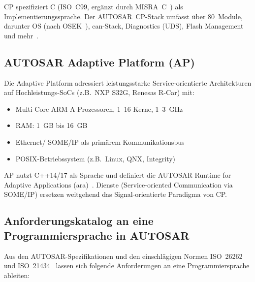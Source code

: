 ﻿\documentclass[12pt,a4paper,twoside]{article}
\begin{document}
CP spezifiziert C (ISO~C99, ergänzt durch MISRA~C~\cite{misra_c2012})
als Implementierungssprache. Der AUTOSAR~CP-Stack umfasst über 80~Module,
darunter OS (nach OSEK~\cite{osek_spec}), \gls{can}-Stack, Diagnostics (UDS),
Flash Management und mehr~\cite{autosar_cp_r23}.

\subsection{AUTOSAR Adaptive Platform (AP)}
\label{subsec:ap}

Die Adaptive Platform adressiert leistungsstarke Service-orientierte Architekturen
auf Hochleistungs-SoCs (z.B.\ NXP S32G, Renesas R-Car) mit:
\begin{itemize}
  \item Multi-Core ARM-A-Prozessoren, 1--16 Kerne, 1--3~GHz
  \item RAM: 1~GB bis 16~GB
  \item Ethernet/ SOME/IP als primärem Kommunikationsbus
  \item POSIX-Betriebssystem (z.B.\ Linux, QNX, Integrity)
\end{itemize}

AP nutzt C++14/17 als Sprache und definiert die
AUTOSAR Runtime for Adaptive Applications (\gls{ara})~\cite{autosar_ap_explained2019}.
Dienste (Service-oriented Communication via SOME/IP) ersetzen weitgehend
das Signal-orientierte Paradigma von CP.

\subsection{Anforderungskatalog an eine Programmiersprache in AUTOSAR}
\label{subsec:anforderungen}

Aus den AUTOSAR-Spezifikationen und den einschlägigen Normen
ISO~26262~\cite{iso26262_2018} und ISO~21434~\cite{iso21434_2021}
lassen sich folgende Anforderungen an eine Programmiersprache ableiten:
\end{document}
